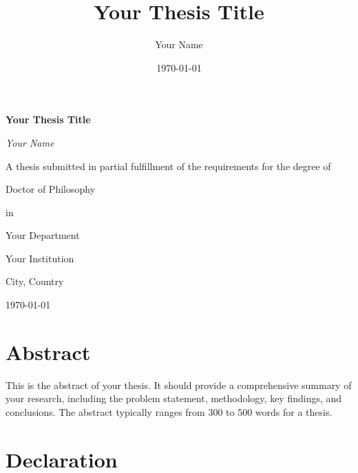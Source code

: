 \documentclass[12pt,a4paper,twoside,openright]{report}
\title{Your Thesis Title}
\author{Your Name}
\date{\today}
\theoremstyle{definition}
\theoremstyle{remark}
\begin{document}
\frontmatter

\begin{titlepage}
\centering
\vspace*{2cm}

{\Huge\bfseries Your Thesis Title\par}
\vspace{2cm}

{\Large\itshape Your Name\par}
\vspace{2cm}

{\large A thesis submitted in partial fulfillment of the requirements for the degree of\par}
\vspace{1cm}

{\Large Doctor of Philosophy\par}
\vspace{1cm}

{\large in\par}
\vspace{0.5cm}

{\Large Your Department\par}
\vspace{2cm}

{\large Your Institution\par}
\vspace{0.5cm}

{\large City, Country\par}
\vspace{1cm}

{\large \today\par}

\vfill
\end{titlepage}

\chapter*{Abstract}

This is the abstract of your thesis. It should provide a comprehensive summary of your research, including the problem statement, methodology, key findings, and conclusions. The abstract typically ranges from 300 to 500 words for a thesis.

\chapter*{Declaration}
\end{document}
